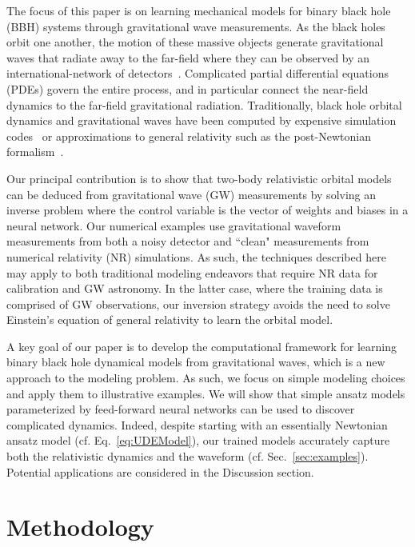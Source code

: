 \documentclass[ reprint,
nofootinbib,
 amsmath,amssymb,
 aps,
]{revtex4-2}
\begin{document}
The focus of this paper is on learning mechanical models for binary black hole (BBH) systems through gravitational wave measurements. 
As the  black holes orbit one another, the motion of these massive objects generate 
gravitational waves that radiate away to the far-field where they 
can be observed by an international-network of detectors~\cite{abbott2020gwtc}.
Complicated partial differential equations (PDEs) govern the entire process, and in particular
connect the near-field dynamics to the far-field gravitational radiation. Traditionally, 
black hole orbital dynamics and 
gravitational waves have been computed by expensive simulation codes~\cite{lehner2014numerical}
or approximations to general relativity such as the post-Newtonian formalism~\cite{blanchet2014gravitational}.

Our principal contribution is to show that two-body relativistic orbital models can be deduced from gravitational wave (GW) measurements 
by solving an inverse problem \cite{vogel2002computational,arridge_maass_oktem_schonlieb_2019} where the control variable is the vector of weights and biases in a neural network. Our numerical examples use
gravitational waveform measurements from both a noisy detector and
``clean" measurements from numerical relativity (NR)
simulations. As such, the techniques described here may apply to 
both traditional modeling endeavors that require NR data 
for calibration and GW astronomy. In the latter case,
where the training data is comprised of GW observations,
our inversion strategy avoids the need to solve Einstein's equation of general relativity
to learn the orbital model.

A key goal of our paper is to 
develop the computational framework for learning binary
black hole dynamical models from gravitational waves, 
which is a new approach to the modeling problem. As such, 
we focus on simple modeling choices and apply them
to illustrative examples. We will show that
simple ansatz models parameterized by feed-forward neural networks
can be used to discover complicated dynamics. Indeed, despite starting
with an essentially Newtonian ansatz model (cf. Eq.~\eqref{eq:UDEModel}),
our trained models accurately capture both the relativistic dynamics
and the waveform (cf. Sec.~\ref{sec:examples}). Potential applications are considered
in the Discussion section.


\section{Methodology} 
\end{document}
